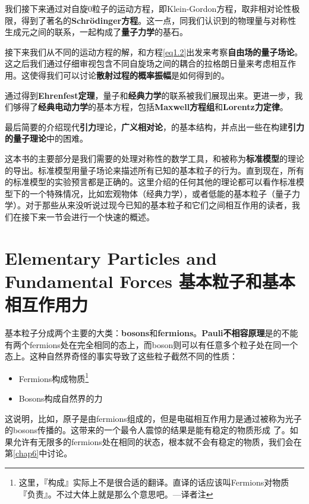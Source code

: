 我们接下来通过对自旋$0$粒子的运动方程，即Klein-Gordon方程，取非相对论性极限，得到了著名的{\bf Schrödinger方程}。这一点，同我们认识到的物理量与对称性生成元之间的联系，一起构成了{\bf 量子力学}的基石。

接下来我们从不同的运动方程的解，和方程\eqref{eq1.2}出发来考察{\bf 自由场的量子场论}。这之后我们通过仔细审视包含不同自旋场之间的耦合的拉格朗日量来考虑相互作用。这使得我们可以讨论{\bf 散射过程的概率振幅}是如何得到的。

通过得到{\bf Ehrenfest定理}，量子和{\bf 经典力学}的联系被我们展现出来。更进一步，我们够得了{\bf 经典电动力学}的基本方程，包括{\bf Maxwell方程组}和{\bf Lorentz力定律}。

最后简要的介绍现代{\bf 引力}理论，{\bf 广义相对论}，的基本结构，并点出一些在构建{\bf 引力的量子理论}中的困难。

这本书的主要部分是我们需要的处理对称性的数学工具，和被称为{\bf 标准模型}的理论的导出。标准模型用量子场论来描述所有已知的基本粒子的行为。直到现在，所有的标准模型的实验预言都是正确的。这里介绍的任何其他的理论都可以看作标准模型下的一个特殊情况，比如宏观物体（经典力学），或者低能的基本粒子（量子力学）。对于那些从来没听说过现今已知的基本粒子和它们之间相互作用的读者，我们在接下来一节会进行一个快速的概述。

\section[基本粒子和基本相互作用力]{Elementary Particles and Fundamental Forces 基本粒子和基本相互作用力}\label{sec1.3}

基本粒子分成两个主要的大类：{\bf bosons}和{\bf fermions}。{\bf Pauli不相容原理}是的不能有两个fermions处在完全相同的态上，而boson则可以有任意多个粒子处在同一个态上。这种自然界奇怪的事实导致了这些粒子截然不同的性质：

\begin{itemize}
\item Fermions构成物质\footnote{这里，『构成』实际上不是很合适的翻译。直译的话应该叫Fermions对物质『负责』。不过大体上就是那么个意思吧。---译者注}
\item Bosons构成自然界的力
\end{itemize}

这说明，比如，原子是由fermions组成的，但是电磁相互作用力是通过被称为光子的bosons传播的。这带来的一个最令人震惊的结果是能有稳定的物质形成 了。如果允许有无限多的fermions处在相同的状态，根本就不会有稳定的物质，我们会在第\ref{chap6}中讨论。

